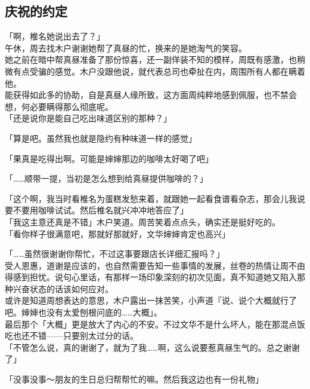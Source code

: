 \subsection{庆祝的约定}

「啊，椎名她说出去了？」\\

午休，周去找木户谢谢她帮了真昼的忙，换来的是她淘气的笑容。\\

她之前在暗中帮真昼准备了那份惊喜，还一副佯装不知的模样，周既有感激，也稍微有点受骗的感觉。木户没跟他说，就代表总司也牵扯在内，周围所有人都在瞒着他。\\

能获得如此多的协助，自是真昼人缘所致，这方面周纯粹地感到佩服，也不禁会想，何必要瞒得那么彻底呢。\\

「还是说你是能自己吃出味道区别的那种？」

「算是吧。虽然我也就是隐约有种味道一样的感觉」

「果真是吃得出啊。可能是婶婶那边的咖啡太好喝了吧」

「……顺带一提，当初是怎么想到给真昼提供咖啡的？」

「这个啊，我当时看椎名为蛋糕发愁来着，就跟她一起看食谱看杂志，那会儿我说要不要用咖啡试试。然后椎名就兴冲冲地答应了」\\

「我这主意还真是不错」木户笑道。周苦笑着点点头，确实还是挺好吃的。\\

「看你样子很满意吧，那就好那就好，文华婶婶肯定也高兴」

「……虽然很谢谢你帮忙，不过这事要跟店长详细汇报吗？」\\

受人恩惠，道谢是应该的，也自然需要告知一些事情的发展，丝卷的热情让周不由得感到担忧。说句心里话，有那样一场印象深刻的初次见面，真不知道她又陷入那种兴奋状态的话该如何应对。\\

或许是知道周想表达的意思，木户露出一抹苦笑，小声道『说、说个大概就行了吧。婶婶也没有太爱刨根问底的……大概」。\\

最后那个「大概」更是放大了内心的不安。不过文华不是什么坏人，能在那混点饭吃也还不错——只要别太过分的话。\\

「不管怎么说，真的谢谢了，就为了我……啊，这么说要惹真昼生气的。总之谢谢了」

「没事没事～朋友的生日总归帮帮忙的嘛。然后我这边也有一份礼物」\\

